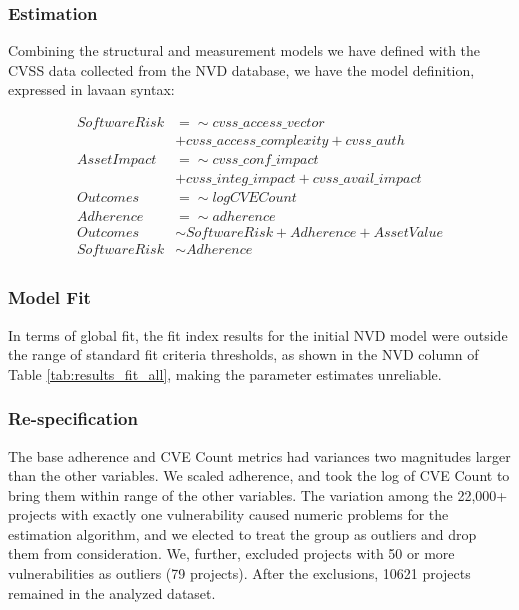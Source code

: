 \subsubsection{Estimation}

Combining the structural and measurement models we have defined with the CVSS data collected from the NVD database, we have the model definition, expressed in lavaan syntax: 

\begin{equation}
\begin{split}
	SoftwareRisk &=\sim cvss\_access\_vector \\ 
	&+ cvss\_access\_complexity + cvss\_auth\\
	AssetImpact &=\sim cvss\_conf\_impact\\
	&+ cvss\_integ\_impact + cvss\_avail\_impact\\
	Outcomes &=\sim logCVECount\\
	Adherence &=\sim adherence\\
	Outcomes &\sim SoftwareRisk + Adherence + AssetValue\\
	SoftwareRisk &\sim Adherence\\
\end{split}
\end{equation}		

\subsubsection{Model Fit} 
In terms of global fit, the fit index results for the initial NVD model were outside the range of standard fit criteria thresholds, as shown in the NVD column of Table \ref{tab:results_fit_all}, making the parameter estimates unreliable. 

\subsubsection{Re-specification}
The base adherence and CVE Count metrics had variances two magnitudes larger than the other variables. We scaled adherence, and took the log of CVE Count to bring them within range of the other variables. The variation among the 22,000+ projects with exactly one vulnerability caused numeric problems for the estimation algorithm, and we elected to treat the group as outliers and drop them from consideration. We, further, excluded projects with 50 or more vulnerabilities as outliers (79 projects). After the exclusions, 10621 projects remained in the analyzed dataset.

